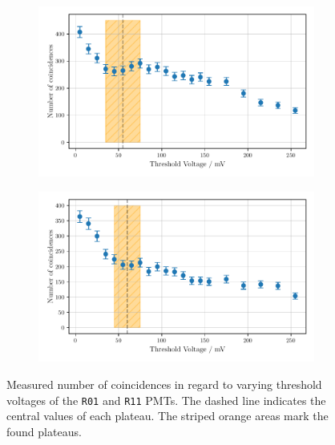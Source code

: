 \begin{figure}
    \begin{subfigure}[b]{0.48\textwidth}
        \includegraphics[width=\textwidth]{plots/threshR01.pdf}
    \end{subfigure}\hfill
    \begin{subfigure}[b]{0.48\textwidth}
        \includegraphics[width=\textwidth]{plots/threshR11.pdf}
    \end{subfigure}
    \caption{Measured number of coincidences in regard to varying threshold voltages
    of the \texttt{R01} and \texttt{R11} PMTs.
    The dashed line indicates the central values of each plateau. The striped orange areas mark the found plateaus.}
    \label{fig:appthresh2}
\end{figure}   
